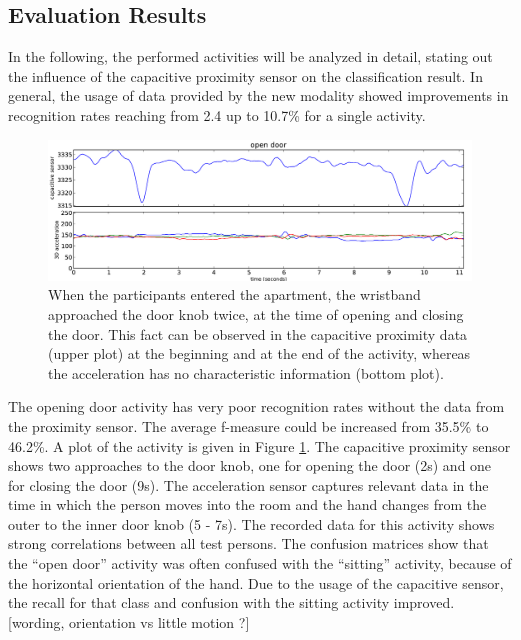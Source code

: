 \documentclass[runningheads,a4paper]{llncs}
\begin{document}
\subsection{Evaluation Results}
\label{sect:evaluation}

In the following, the performed activities will be analyzed in detail, stating out the influence of the capacitive proximity sensor on the classification result. In general, the usage of data provided by the new modality showed improvements in recognition rates reaching from 2.4 up to 10.7\% for a single activity.

\begin{figure}
	\centering
		\includegraphics[width=1.00\textwidth]{../Auswertung/images/tobias_1.pdf}
	\caption{When the participants entered the apartment, the wristband approached the door knob twice, at the time of opening and closing the door. This fact can be observed in the capacitive proximity data (upper plot) at the beginning and at the end of the activity, whereas the acceleration has no characteristic information (bottom plot).}
	\label{fig:opendoor}
\end{figure}

The opening door activity has very poor recognition rates without the data from the proximity sensor. The average f-measure could be increased from 35.5\% to 46.2\%. A plot of the activity is given in Figure \ref{fig:opendoor}. The capacitive proximity sensor shows two approaches to the door knob, one for opening the door (2s) and one for closing the door (9s). The acceleration sensor captures relevant data in the time in which the person moves into the room and the hand changes from the outer to the inner door knob (5 - 7s). The recorded data for this activity shows strong correlations between all test persons. The confusion matrices show that the ``open door'' activity was often confused with the ``sitting'' activity, because of the horizontal orientation of the hand. Due to the usage of the capacitive sensor, the recall for that class and confusion with the sitting activity improved. [wording, orientation vs little motion ?]
\end{document}

